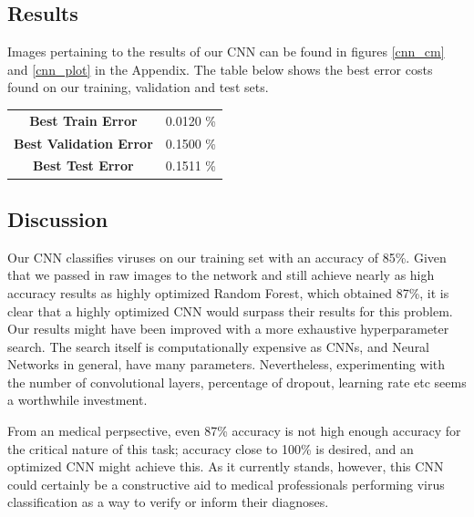 \begin{multicols}{2}
\subsection{Results}
Images pertaining to the results of our CNN can be found in figures \ref{cnn_cm} and \ref{cnn_plot} in the Appendix. The table below shows the best error costs found on our training, validation and test sets. 

\begin{center}
\begin{tabular}{cc}
\toprule
 \textbf{Best Train Error} 			& 0.0120 \% \\ 
 \textbf{Best Validation Error}     & 0.1500 \% \\  
 \textbf{Best Test Error} 			& 0.1511 \% \\ \bottomrule
\end{tabular}
\end{center}

\subsection{Discussion}

Our CNN classifies viruses on our training set with an accuracy of 85\%. Given that we passed in raw images to the network and still achieve nearly as high accuracy results as \citet{kylberg2011virus} highly optimized Random Forest, which obtained 87\%, it is clear that a highly optimized CNN would surpass their results for this problem. Our results might have been improved with a more exhaustive hyperparameter search. The search itself is computationally expensive as CNNs, and Neural Networks in general, have many parameters. Nevertheless, experimenting with the number of convolutional layers, percentage of dropout, learning rate etc seems a worthwhile investment.

From an medical perpsective, even 87\% accuracy is not high enough accuracy for the critical nature of this task; accuracy close to 100\% is desired, and an optimized CNN might achieve this. As it currently stands, however, this CNN could certainly be a constructive aid to medical professionals performing virus classification as a way to verify or inform their diagnoses.


\end{multicols}
